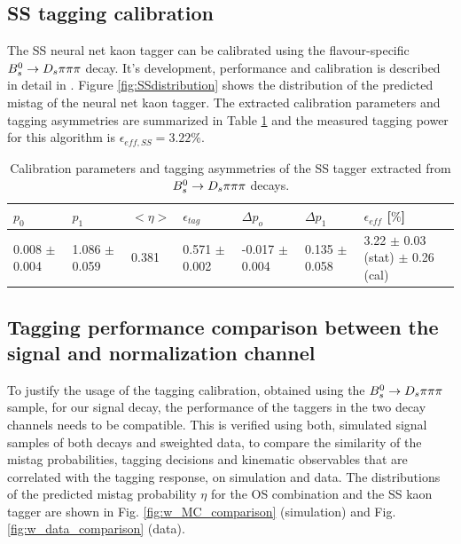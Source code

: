 \subsection{SS tagging calibration}
\label{subsec: SScalibration}
The SS neural net kaon tagger can be calibrated using the flavour-specific ${{B}^0_{s}}\rightarrow{\ensuremath{{D}_{s}}}{\ensuremath{\pi}}{\ensuremath{\pi}}{\ensuremath{\pi}}$ decay. It's development, performance and calibration is described in detail in \cite{Aaij:2016psi}. 
Figure \ref{fig:SSdistribution} shows the distribution of the predicted mistag of the neural net kaon tagger. 
The extracted calibration parameters and tagging asymmetries are summarized in Table \ref{table: SScalibration} and the measured tagging power for this algorithm is $\epsilon_{eff,SS} = 3.22  \%$.

\begin{table}[h]
\centering
\scriptsize
 \begin{tabular}{l l l l | l l | l}
\hline
$p_{0}$ & $p_{1}$ & $<\eta>$ & $\epsilon_{tag}$ & $\Delta p_{o}$ & $\Delta p_{1}$ & $\epsilon_{eff}$ [$\%$] \\
\hline
0.008 $\pm$ 0.004  & 1.086 $\pm$ 0.059 & 0.381 & 0.571 $\pm$ 0.002 & -0.017 $\pm$ 0.004  & 0.135 $\pm$ 0.058 & 3.22 $\pm$ 0.03 (stat) $\pm$ 0.26 (cal) \\
\hline
\end{tabular}
\caption{Calibration parameters and tagging asymmetries of the SS tagger extracted from ${{B}^0_{s}}\rightarrow{\ensuremath{{D}_{s}}}{\ensuremath{\pi}}{\ensuremath{\pi}}{\ensuremath{\pi}}$ decays.}
\label{table: SScalibration}
\normalsize
\end{table}


\subsection{Tagging performance comparison between the signal and normalization channel}
\label{subsec: TaggingComparison}

To justify the usage of the tagging calibration, obtained using the ${{B}^0_{s}}\rightarrow{\ensuremath{{D}_{s}}}{\ensuremath{\pi}}{\ensuremath{\pi}}{\ensuremath{\pi}}$ sample, for our signal decay, the performance of the taggers in the two decay channels needs to be compatible. 
This is verified using both, simulated signal samples of both decays and sweighted data, 
to compare the similarity of the mistag probabilities, tagging decisions and kinematic observables that are correlated with the tagging response, on simulation and data.  \newline
The distributions of the predicted mistag probability $\eta$ for the OS combination and the SS kaon tagger are shown in Fig. \ref{fig:w_MC_comparison} (simulation) and Fig. \ref{fig:w_data_comparison} (data).
 

